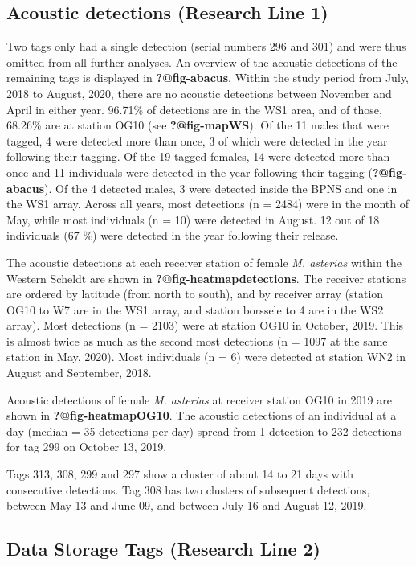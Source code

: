 \documentclass[
  authoryear,
  review,
  3p]{elsarticle}
\begin{document}
\hypertarget{sec-res-acoustic}{%
\subsection{Acoustic detections (Research Line
1)}\label{sec-res-acoustic}}

Two tags only had a single detection (serial numbers 296 and 301) and
were thus omitted from all further analyses. An overview of the acoustic
detections of the remaining tags is displayed in \textbf{?@fig-abacus}.
Within the study period from July, 2018 to August, 2020, there are no
acoustic detections between November and April in either year. 96.71\%
of detections are in the WS1 area, and of those, 68.26\% are at station
OG10 (see \textbf{?@fig-mapWS}). Of the 11 males that were tagged, 4
were detected more than once, 3 of which were detected in the year
following their tagging. Of the 19 tagged females, 14 were detected more
than once and 11 individuals were detected in the year following their
tagging (\textbf{?@fig-abacus}). Of the 4 detected males, 3 were
detected inside the BPNS and one in the WS1 array. Across all years,
most detections (n = 2484) were in the month of May, while most
individuals (n = 10) were detected in August. 12 out of 18 individuals
(67 \%) were detected in the year following their release.

The acoustic detections at each receiver station of female \emph{M.
asterias} within the Western Scheldt are shown in
\textbf{?@fig-heatmapdetections}. The receiver stations are ordered by
latitude (from north to south), and by receiver array (station OG10 to
W7 are in the WS1 array, and station borssele to 4 are in the WS2
array). Most detections (n = 2103) were at station OG10 in October,
2019. This is almost twice as much as the second most detections (n =
1097 at the same station in May, 2020). Most individuals (n = 6) were
detected at station WN2 in August and September, 2018.

Acoustic detections of female \emph{M. asterias} at receiver station
OG10 in 2019 are shown in \textbf{?@fig-heatmapOG10}. The acoustic
detections of an individual at a day (median = 35 detections per day)
spread from 1 detection to 232 detections for tag 299 on October 13,
2019.

Tags 313, 308, 299 and 297 show a cluster of about 14 to 21 days with
consecutive detections. Tag 308 has two clusters of subsequent
detections, between May 13 and June 09, and between July 16 and August
12, 2019.

\hypertarget{sec-results-dst}{%
\subsection{Data Storage Tags (Research Line 2)}\label{sec-results-dst}}
\end{document}
